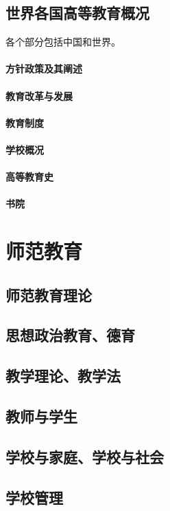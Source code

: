 \documentclass[UTF8]{../../ApplicationUniverse}
\begin{document}
\section{世界各国高等教育概况}
各个部分包括中国和世界。
    \subsubsection{方针政策及其阐述}
    \subsubsection{教育改革与发展}
    \subsubsection{教育制度}
    \subsubsection{学校概况}
    \subsubsection{高等教育史}
    \subsubsection{书院}



 
\chapter{师范教育}
\section{师范教育理论}
\section{思想政治教育、德育}
\section{教学理论、教学法}
\section{教师与学生}
\section{学校与家庭、学校与社会}
\section{学校管理}
\end{document}
